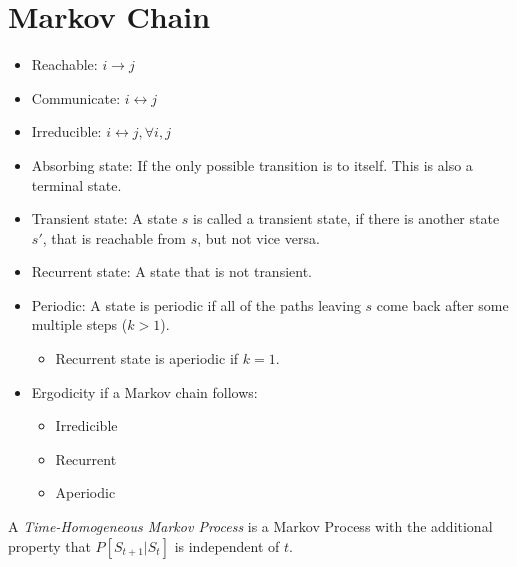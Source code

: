\section{Markov Chain}
\begin{itemize}
	\item Reachable: $i\to j$
	\item Communicate: $i\leftrightarrow j$
	\item Irreducible: $i\leftrightarrow j, \forall i,j$
	\item Absorbing state: If the only possible transition is to itself. This is also a terminal state.
	\item Transient state: A state $s$ is called a transient state, if there is another state $s'$, that is reachable from $s$, but not vice versa. 
	\item Recurrent state: A state that is not transient. 
	\item Periodic: A state is periodic if all of the paths leaving $s$ come back after some multiple steps ($k>1$). 
		\begin{itemize}
			\item Recurrent state is aperiodic if $k=1$.
		\end{itemize}
	\item Ergodicity if a Markov chain follows:
		\begin{itemize}
			\item Irredicible
			\item Recurrent
			\item Aperiodic
		\end{itemize}
\end{itemize}


A \textit{Time-Homogeneous Markov Process} is a Markov Process with the additional property that $P[S_{t+1}|S_t]$ is independent of $t$.

